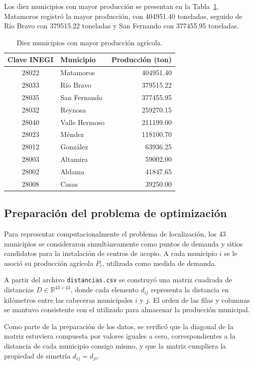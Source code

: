 \documentclass[journal]{IEEEtran}
\begin{document}
Los diez municipios con mayor producción se presentan en la Tabla~\ref{tab:top10_produccion}. Matamoros registró la mayor producción, con 404951.40 toneladas, seguido de Río Bravo con 379515.22 toneladas y San Fernando con 377455.95 toneladas.

\begin{table}[!t]
	\centering
	\caption{Diez municipios con mayor producción agrícola.}
	\label{tab:top10_produccion}
	\begin{tabular}{cl r}
		\toprule
		\textbf{Clave INEGI} & \textbf{Municipio} & \textbf{Producción (ton)} \\
		\midrule
		28022 & Matamoros     & 404951.40 \\
		28033 & Río Bravo     & 379515.22 \\
		28035 & San Fernando  & 377455.95 \\
		28032 & Reynosa       & 259270.15 \\
		28040 & Valle Hermoso & 211199.00 \\
		28023 & Méndez        & 118100.70 \\
		28012 & González      &  63936.25 \\
		28003 & Altamira      &  59002.00 \\
		28002 & Aldama        &  41847.65 \\
		28008 & Casas         &  39250.00 \\
		\bottomrule
	\end{tabular}
\end{table}

\subsection{Preparación del problema de optimización}

Para representar computacionalmente el problema de localización, los 43 municipios se consideraron simultáneamente como puntos de demanda y sitios candidatos para la instalación de centros de acopio. A cada municipio $i$ se le asoció su producción agrícola $P_i$, utilizada como medida de demanda.

A partir del archivo \texttt{distancias.csv} se construyó una matriz cuadrada de distancias $D \in \mathbb{R}^{43 \times 43}$, donde cada elemento $d_{ij}$ representa la distancia en kilómetros entre las cabeceras municipales $i$ y $j$. El orden de las filas y columnas se mantuvo consistente con el utilizado para almacenar la producción municipal.

Como parte de la preparación de los datos, se verificó que la diagonal de la matriz estuviera compuesta por valores iguales a cero, correspondientes a la distancia de cada municipio consigo mismo, y que la matriz cumpliera la propiedad de simetría $d_{ij}=d_{ji}$.
\end{document}
